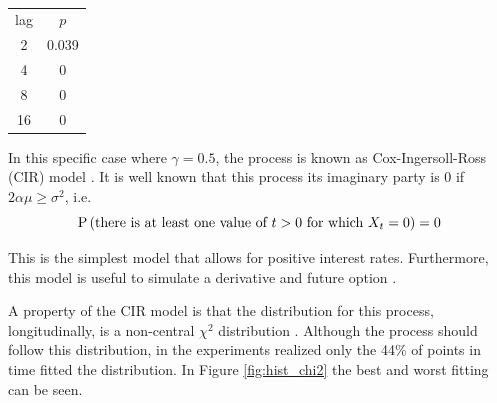 \documentclass[11pt]{article}
\theoremstyle{definition}
\theoremstyle{remark}
\theoremstyle{remark}
\begin{document}
\begin{table}[H]
  \centering
  \begin{tabular}{cc}
    \hline
    lag & $p$   \\
    2   & 0.039 \\
    4   & 0     \\
    8   & 0     \\
    16  & 0     \\ \hline
  \end{tabular}
  \caption{}
  \label{tab:vrt2}
\end{table}

In this specific case where $\gamma=0.5$, the process is known as
Cox-Ingersoll-Ross (CIR) model \parencite{cox1985}. It is well known that
this process its imaginary party is 0 if $2\alpha\mu \ge \sigma^2$,
i.e.
\begin{equation*}
  \P{\text{there is at least one value of } t > 0 \text{ for which }
    X_t = 0} = 0
\end{equation*}

This is the simplest model that allows for positive interest
rates. Furthermore, this model is useful to simulate a derivative and
future option \parencite{unknown2017}.

A property of the CIR model is that the distribution for this process,
longitudinally, is a non-central $\chi^2$ distribution
\parencite{dyrting2004}. Although the process should follow this
distribution, in the experiments realized only the 44\% of points in
time fitted the distribution. In Figure \ref{fig:hist_chi2} the best
and worst fitting can be seen.
\end{document}
